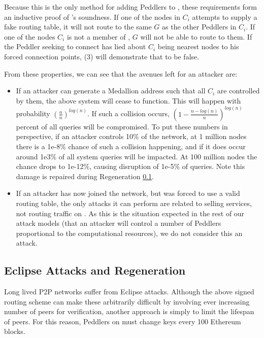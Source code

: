 Because this is the only method for adding Peddlers to \tOM{}, these requirements form an inductive proof of \tOM{}'s soundness. If one of the nodes in $C_i$ attempts to supply a fake routing table, it will not route to the same $G$ as the other Peddlers in $C_i$. If one of the nodes $C_i$ is not a member of \tOM{}, $G$ will not be able to route to them. If the Peddler seeking to connect has lied about $C_i$ being nearest nodes to his forced connection points, (3) will demonstrate that to be false.

From these properties, we can see that the avenues left for an attacker are:

\begin{itemize}
\item If an attacker can generate a Medallion address such that all $C_i$ are controlled by them, the above system will cease to function. This will happen with probability $(\frac{a}{n})^{log(n)}$. If such a collision occurs, $(1 - \frac{n-log(n)}{n})^{log(n)}$ percent of all queries will be compromised. To put these numbers in perspective, if an attacker controls 10\% of the network, at 1 million nodes there is a 1e-8\% chance of such a collision happening, and if it does occur around 1e3\% of all system queries will be impacted. At 100 million nodes the chance drops to 1e-12\%, causing disruption of 1e-5\% of queries. Note this damage is repaired during Regeneration \ref{agora-regen}.
\item If an attacker has now joined the network, but was forced to use a valid routing table, the only attacks it can perform are related to selling services, not routing traffic on \tOM{}. As this is the situation expected in the rest of our attack models (that an attacker will control a number of Peddlers proportional to the computational resources), we do not consider this an attack.
\end{itemize}

\subsection{Eclipse Attacks and Regeneration}
\label{agora-regen}

Long lived P2P networks suffer from Eclipse attacks. Although the
above signed routing scheme can make these arbitrarily difficult by
involving ever increasing number of peers for verification, another
approach is simply to limit the lifespan of peers. For this reason,
Peddlers on \tOM{} must change keys every 100 Ethereum blocks.

